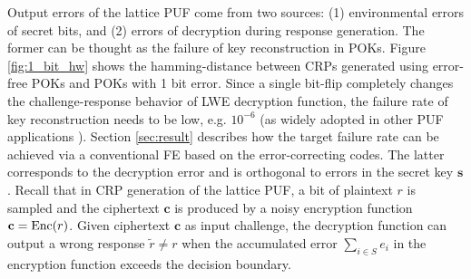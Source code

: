 Output errors of the lattice PUF come from two sources: (1) environmental errors of secret bits, and (2) errors of decryption during response generation.
The former can be thought as the failure of key reconstruction in POKs.
Figure \ref{fig:1_bit_hw} shows the hamming-distance between CRPs generated using error-free POKs and POKs with 1 bit error.
Since a single bit-flip completely changes the challenge-response behavior of LWE decryption function, the failure rate of key reconstruction needs to be low, e.g. $10^{-6}$ (as widely adopted in other PUF applications \cite{maes2012pufky}).
Section \ref{sec:result} describes how the target failure rate can be achieved via a conventional FE based on the error-correcting codes.
The latter corresponds to the decryption error and is orthogonal to errors in the secret key $\mathbf{s}$. 
Recall that in CRP generation of the lattice PUF, a bit of plaintext $r$ is sampled and the ciphertext $\mathbf{c}$ is produced by a noisy encryption function $\mathbf{c}=\Enc(r)$. 
Given ciphertext $\mathbf{c}$ as input challenge, the decryption function can output a wrong response $\tilde{r}\neq r$ when the accumulated error $\sum_{i\in S} e_i$ in the encryption function exceeds the decision boundary.


